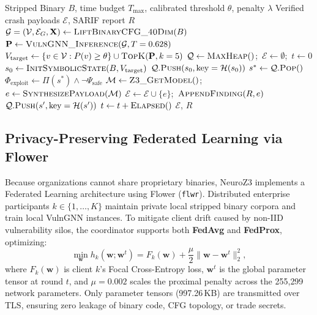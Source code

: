 \documentclass[10pt,conference]{IEEEtran}
\begin{document}
\begin{algorithm}[!t]
\caption{NeuroZ3: Neuro-Guided Exploit Verification}
\label{alg:neuroz3}
\begin{algorithmic}[1]
\REQUIRE Stripped Binary $B$, time budget $T_{\max}$, calibrated threshold $\theta$, penalty $\lambda$
\ENSURE Verified crash payloads $\mathcal{E}$, SARIF report $R$
\STATE $\mathcal{G} = (\mathcal{V}, \mathcal{E}_G, \mathbf{X}) \leftarrow \textsc{LiftBinaryCFG\_40Dim}(B)$
\STATE $\mathbf{P} \leftarrow \textsc{VulnGNN\_Inference}(\mathcal{G}, T=0.628)$ 
\STATE $V_{\text{target}} \leftarrow \{v \in \mathcal{V} : P(v) \geq \theta\} \cup \textsc{TopK}(\mathbf{P}, k=5)$
\STATE $\mathcal{Q} \leftarrow \textsc{MaxHeap}()$;\ $\mathcal{E} \leftarrow \emptyset$;\ $t \leftarrow 0$
\STATE $s_0 \leftarrow \textsc{InitSymbolicState}(B, V_{\text{target}})$
\STATE $\mathcal{Q}.\textsc{Push}(s_0, \text{key}=\mathcal{H}(s_0))$
  \STATE $s^* \leftarrow \mathcal{Q}.\textsc{Pop}()$
    \STATE $\Phi_{\text{exploit}} \leftarrow \Pi(s^*) \land \neg \Psi_{\text{safe}}$ 
      \STATE $\mathcal{M} \leftarrow \textsc{Z3\_GetModel}()$;\ $e \leftarrow \textsc{SynthesizePayload}(\mathcal{M})$
        \STATE $\mathcal{E} \leftarrow \mathcal{E} \cup \{e\}$;\ $\textsc{AppendFinding}(R, e)$
      \ENDIF
    \ENDIF
  \ENDIF
    \STATE $\mathcal{Q}.\textsc{Push}(s', \text{key}=\mathcal{H}(s'))$
  \ENDFOR
  \STATE $t \leftarrow t + \textsc{Elapsed}()$
\ENDWHILE
\RETURN $\mathcal{E}$, $R$
\end{algorithmic}
\end{algorithm}

\subsection{Privacy-Preserving Federated Learning via Flower}
Because organizations cannot share proprietary binaries, NeuroZ3 implements a Federated Learning architecture using Flower
(\texttt{flwr}). Distributed enterprise participants $k \in \{1, \dots, K\}$ maintain private local stripped binary corpora and train
local VulnGNN instances. To mitigate client drift caused by non-IID vulnerability silos, the coordinator supports both \textbf{FedAvg}
and \textbf{FedProx}, optimizing:
\begin{equation}
  \min_{\mathbf{w}} h_k(\mathbf{w}; \mathbf{w}^t) = F_k(\mathbf{w}) + \frac{\mu}{2} \|\mathbf{w} - \mathbf{w}^t\|_2^2,
  \label{eq:fedprox}
\end{equation}
where $F_k(\mathbf{w})$ is client $k$'s Focal Cross-Entropy loss, $\mathbf{w}^t$ is the global parameter tensor at round $t$,
and $\mu = 0.002$ scales the proximal penalty across the 255{,}299 network parameters. Only parameter tensors (997.26\,KB) are
transmitted over TLS, ensuring zero leakage of binary code, CFG topology, or trade secrets.
\end{document}
